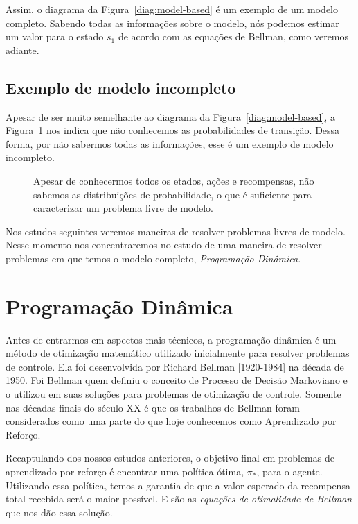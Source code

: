 \documentclass{article}
\begin{document}
            Assim, o diagrama da Figura~\ref{diag:model-based} é um exemplo de um modelo completo. Sabendo todas as informações sobre o modelo, nós podemos estimar um valor para o estado $s_1$ de acordo com as equações de Bellman, como veremos adiante.
            
        \subsection{Exemplo de modelo incompleto}
    
            Apesar de ser muito semelhante ao diagrama da Figura~\ref{diag:model-based}, a Figura~\ref{diag:model-free} nos indica que não conhecemos as probabilidades de transição. Dessa forma, por não sabermos todas as informações, esse é um exemplo de modelo incompleto. 

            \begin{figure}[ht]
                \centering
                \mdpthreestatenoprobs
                \caption{Apesar de conhecermos todos os etados, ações e recompensas, não sabemos as distribuições de probabilidade, o que é suficiente para caracterizar um problema livre de modelo.}
                \label{diag:model-free}
            \end{figure}

            Nos estudos seguintes veremos maneiras de resolver problemas livres de modelo. Nesse momento nos concentraremos no estudo de uma maneira de resolver problemas em que temos o modelo completo, \emph{Programação Dinâmica}.
    
    \section{Programação Dinâmica}
    
        Antes de entrarmos em aspectos mais técnicos, a programação dinâmica é um método de otimização matemático utilizado inicialmente para resolver problemas de controle. Ela foi desenvolvida por Richard Bellman [1920-1984] na década de 1950. Foi Bellman quem definiu o conceito de Processo de Decisão Markoviano e o utilizou em suas soluções para problemas de otimização de controle. Somente nas décadas finais do século XX é que os trabalhos de Bellman foram considerados como uma parte do que hoje conhecemos como Aprendizado por Reforço.

        Recaptulando dos nossos estudos anteriores, o objetivo final em problemas de aprendizado por reforço é encontrar uma política ótima, $\pi_*$, para o agente. Utilizando essa política, temos a garantia de que a valor esperado da recompensa total recebida será o maior possível. E são as \emph{equações de otimalidade de Bellman} que nos dão essa solução.
    
\end{document}
